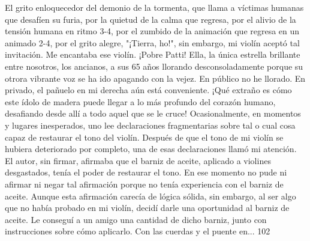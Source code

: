 El grito enloquecedor del demonio de la tormenta, que llama a víctimas humanas que desafíen su furia, por la quietud de la calma que regresa, por el alivio de la tensión humana en ritmo 3-4, por el zumbido de la animación que regresa en un animado 2-4, por el grito alegre, "¡Tierra, ho!", sin embargo, mi violín aceptó tal invitación.
Me encantaba ese violín.
¡Pobre Patti! Ella, la única estrella brillante entre nosotros, los ancianos, a sus 65 años llorando desconsoladamente porque su otrora vibrante voz se ha ido apagando con la vejez.
En público no he llorado.
En privado, el pañuelo en mi derecha aún está
conveniente.
¡Qué extraño es cómo este ídolo de madera puede llegar a lo más profundo del corazón humano, desafiando desde allí a todo aquel que se le cruce!
Ocasionalmente, en momentos y lugares inesperados, uno lee declaraciones fragmentarias sobre tal o cual cosa capaz de restaurar el tono del violín. Después de que el tono de mi violín se hubiera deteriorado por completo, una de esas declaraciones llamó mi atención. El autor, sin firmar, afirmaba que el barniz de aceite, aplicado a violines desgastados, tenía el poder de restaurar el tono. En ese momento no pude ni afirmar ni negar tal afirmación porque no tenía experiencia con el barniz de aceite. Aunque esta afirmación carecía de lógica sólida, sin embargo, al ser algo que no había probado en mi violín, decidí darle una oportunidad al barniz de aceite. Le conseguí a un amigo una cantidad de dicho barniz, junto con instrucciones sobre cómo aplicarlo. Con las cuerdas y el puente en...
102

